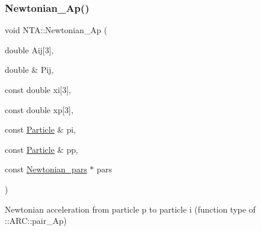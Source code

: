 \hypertarget{namespaceNTA_ac086c632a4f16eddc70f023f269d9c94}{}\label{namespaceNTA_ac086c632a4f16eddc70f023f269d9c94} 
\subsubsection{\texorpdfstring{Newtonian\+\_\+\+Ap()}{Newtonian\_Ap()}}
{\footnotesize\ttfamily void N\+T\+A\+::\+Newtonian\+\_\+\+Ap (\begin{DoxyParamCaption}\item[{double}]{Aij\mbox{[}3\mbox{]},  }\item[{double \&}]{Pij,  }\item[{const double}]{xi\mbox{[}3\mbox{]},  }\item[{const double}]{xp\mbox{[}3\mbox{]},  }\item[{const \hyperlink{classParticle}{Particle} \&}]{pi,  }\item[{const \hyperlink{classParticle}{Particle} \&}]{pp,  }\item[{const \hyperlink{classNTA_1_1Newtonian__pars}{Newtonian\+\_\+pars} $\ast$}]{pars }\end{DoxyParamCaption})}



Newtonian acceleration from particle p to particle i (function type of \+::\+A\+R\+C\+::pair\+\_\+\+Ap) 


